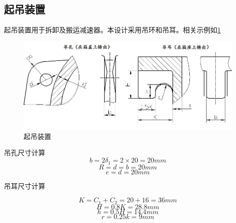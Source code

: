 \subsection{起吊装置}
起吊装置用于拆卸及搬运减速器。本设计采用吊环和吊耳。相关示例如\ref{img3}
\begin{figure}[h]
    \centering
    \includegraphics[scale=0.45]{graphic/10-3.jpg}
    \caption{起吊装置}
    \label{img3}
\end{figure}

吊孔尺寸计算
\[
b=2\delta_1=2\times 20=20mm
\]
\[
R= d=b=20mm
\]
\[
e=d=20mm
\]

吊耳尺寸计算

\[
K=C_1+C_2=20+16=36mm
\]
\[
H=0.8K=28.8mm
\]
\[
h=0.5H=14.4mm
\]
\[
r=0.25k=9mm
\]
